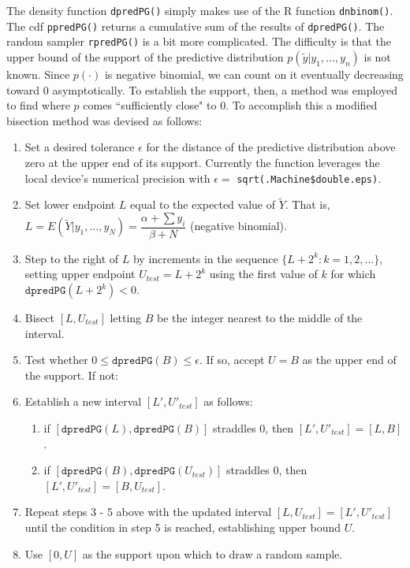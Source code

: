 \documentclass[12pt, a4paper]{article}
\begin{document}
The density function \texttt{dpredPG()} simply makes use of the R function \texttt{dnbinom()}.  The cdf \texttt{ppredPG()} returns a cumulative sum of the results of \texttt{dpredPG()}.  The random sampler \texttt{rpredPG()} is a bit more complicated. The difficulty is that the upper bound of the support of the predictive distribution $p(\tilde{y}|y_1,...,y_n)$ is not known.  Since $p(\cdot)$ is negative binomial, we can count on it eventually decreasing toward $0$ asymptotically.  To establish the support, then, a method was employed to find where $p$ comes ``sufficiently close" to $0$.  To accomplish this a modified bisection method was devised as follows:\\


    \begin{enumerate}
      \item Set a desired tolerance $\epsilon$ for the distance of the predictive distribution above zero at the upper end of its support.  Currently the function leverages the local device's numerical precision with $\epsilon = $ \texttt{sqrt(.Machine\$double.eps)}.
      \item Set lower endpoint $L$ equal to the expected value of $\tilde{Y}$.  That is, $L = E(\tilde{Y}|y_1,...,y_N) = \dfrac{\alpha+\sum{y_i}}{\beta+N}$ (negative binomial). %
      \item Step to the right of $L$ by increments in the sequence $\{L+2^k:k=1,2,...\}$, setting upper endpoint $U_{test} = L+2^k$ using the first value of $k$ for which $\texttt{dpredPG}\left(L + 2^k\right) < 0$.
      \item Bisect $[L,U_{test}]$ letting $B$ be the integer nearest to the middle of the interval.
      \item Test whether $0 \leq \texttt{dpredPG}(B) \leq \epsilon$.  If so, accept $U = B$ as the upper end of the support.  If not:
      \item Establish a new interval $[L',U'_{test}]$ as follows:
      \begin{enumerate}
        \item if $[\texttt{dpredPG}(L),\texttt{dpredPG}(B)]$ straddles $0$, then $[L',U'_{test}] = [L,B]$.
        \item if $[\texttt{dpredPG}(B),\texttt{dpredPG}(U_{test})]$ straddles $0$, then $[L',U'_{test}] = [B,U_{test}]$.
      \end{enumerate}
      \item Repeat steps 3 - 5 above with the updated interval $[L,U_{test}] = [L',U'_{test}]$ until the condition in step 5 is reached, establishing upper bound $U$.
      \item Use $[0,U]$ as the support upon which to draw a random sample.
    \end{enumerate}
\end{document}
